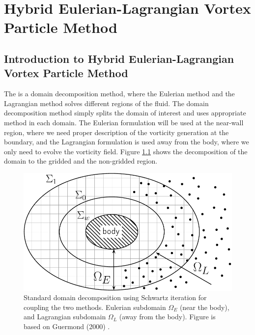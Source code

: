 \chapter{Hybrid Eulerian-Lagrangian Vortex Particle Method}
\label{ch:helvpm}


	\section{Introduction to Hybrid Eulerian-Lagrangian Vortex Particle Method}
	
	The  is a domain decomposition method, where the Eulerian method and the Lagrangian method solves different regions of the fluid. The domain decomposition method simply splits the domain of interest and uses appropriate method in each domain. The Eulerian formulation will be used at the near-wall region, where we need proper description of the vorticity generation at the boundary, and the Lagrangian formulation is used away from the body, where we only need to evolve the vorticity field. Figure \ref{fig:domainDecomposition} shows the decomposition of the domain to the gridded and the non-gridded region.
	
		\begin{figure}[!h]
			\centering
			\includegraphics[width=0.6\linewidth]{figures/hybrid/domainDecomposition_typical_type2-crop.pdf}
			\caption{Standard domain decomposition using Schwartz iteration for coupling the two methods. Eulerian subdomain $\Omega_E$ (near the body), and Lagrangian subdomain $\Omega_L$ (away from the body). Figure is based on Guermond (2000) \cite{Guermond2000a}.}
			\label{fig:domainDecomposition}
		\end{figure}	
	
